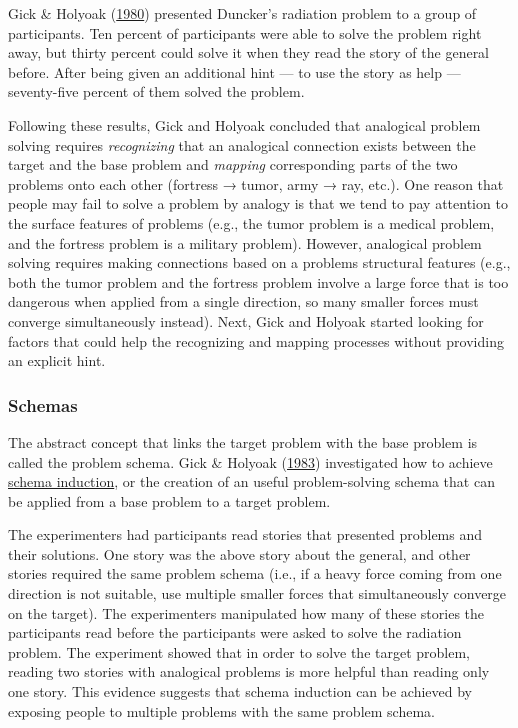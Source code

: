 \documentclass[
]{krantz}
\begin{document}
Gick \& Holyoak (\protect\hyperlink{ref-gick1980analogical}{1980}) presented Duncker's radiation problem to a group of participants. Ten percent of participants were able to solve the problem right away, but thirty percent could solve it when they read the story of the general before. After being given an additional hint --- to use the story as help --- seventy-five percent of them solved the problem.

Following these results, Gick and Holyoak concluded that analogical problem solving requires
\emph{recognizing} that an analogical connection exists between the target and the base problem and \emph{mapping} corresponding parts of the two problems onto each other (fortress → tumor, army → ray, etc.). One reason that people may fail to solve a problem by analogy is that we tend to pay attention to the surface features of problems (e.g., the tumor problem is a medical problem, and the fortress problem is a military problem). However, analogical problem solving requires making connections based on a problems structural features (e.g., both the tumor problem and the fortress problem involve a large force that is too dangerous when applied from a single direction, so many smaller forces must converge simultaneously instead). Next, Gick and Holyoak started looking for factors that could help the recognizing and mapping processes without providing an explicit hint.

\hypertarget{schemas}{%
\subsubsection*{Schemas}\label{schemas}}


The abstract concept that links the target problem with the base problem is called the problem schema. Gick \& Holyoak (\protect\hyperlink{ref-gick1983schema}{1983}) investigated how to achieve \protect\hyperlink{schema-induction}{schema induction}, or the creation of an useful problem-solving schema that can be applied from a base problem to a target problem.

The experimenters had participants read stories that presented problems and their solutions. One story was the above story about the general, and other stories required the same problem schema (i.e., if a heavy force coming from one direction is not suitable, use multiple smaller forces that simultaneously converge on the target). The experimenters manipulated how many of these stories the participants read before the participants were asked to solve the radiation problem. The experiment showed that in order to solve the target problem, reading two stories with analogical problems is more helpful than reading only one story. This evidence suggests that schema induction can be achieved by exposing people to multiple problems with the same problem schema.
\end{document}
